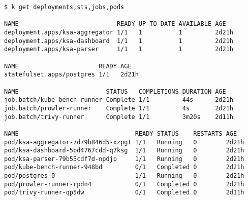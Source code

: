 \begin{lstlisting}[language=CustomBash, caption={[Kubernetes workloads for the KSA Dashboard] Kubernetes workloads for the KSA Dashboard.}, label={lst:ksa-kubernetes-resources}]
$ k get deployments,sts,jobs,pods

NAME                           READY UP-TO-DATE AVAILABLE AGE
deployment.apps/ksa-aggregator 1/1   1          1         2d21h
deployment.apps/ksa-dashboard  1/1   1          1         2d21h
deployment.apps/ksa-parser     1/1   1          1         2d21h

NAME                      READY AGE
statefulset.apps/postgres 1/1   2d21h

NAME                        STATUS   COMPLETIONS DURATION AGE
job.batch/kube-bench-runner Complete 1/1         44s      2d21h
job.batch/prowler-runner    Complete 1/1         4s       2d21h
job.batch/trivy-runner      Complete 1/1         3m20s    2d11h

NAME                                READY STATUS    RESTARTS AGE
pod/ksa-aggregator-7d79b846d5-xzpgt 1/1   Running   0        2d21h
pod/ksa-dashboard-5bd4767cdd-q7ksg  1/1   Running   0        2d21h
pod/ksa-parser-79b55cdf7d-npdjp     1/1   Running   0        2d21h
pod/kube-bench-runner-948bd         0/1   Completed 0        2d21h
pod/postgres-0                      1/1   Running   0        2d21h
pod/prowler-runner-rpdn4            0/1   Completed 0        2d21h
pod/trivy-runner-qp5dw              0/1   Completed 0        2d11h
\end{lstlisting}